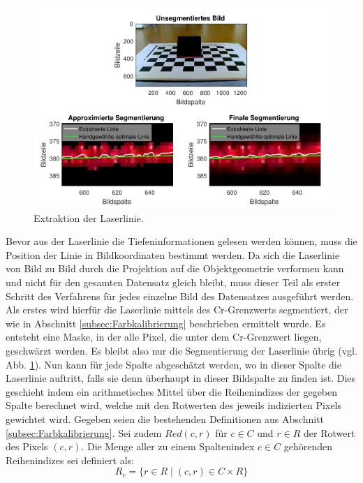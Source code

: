 \begin{figure}
\includegraphics[width=\textwidth]{images/LineSegmentationPlottedCramped2.pdf}
\caption[Extraktion der Laserlinie]{Extraktion der Laserlinie.}\label{fig:LaserLinieExtraktion}
\end{figure}


Bevor aus der Laserlinie die Tiefeninformationen gelesen werden können, muss die Position der Linie in Bildkoordinaten bestimmt werden. Da sich die Laserlinie von Bild zu Bild durch die Projektion auf die Objektgeometrie verformen kann und nicht für den gesamten Datensatz gleich bleibt, muss dieser Teil als erster Schritt des Verfahrens für jedes einzelne Bild des Datensatzes ausgeführt werden. Als erstes wird hierfür die Laserlinie mittels des Cr-Grenzwerts segmentiert, der wie in Abschnitt \ref{subsec:Farbkalibrierung} beschrieben ermittelt wurde. Es entsteht eine Maske, in der alle Pixel, die unter dem Cr-Grenzwert liegen, geschwärzt werden. Es bleibt also nur die Segmentierung der Laserlinie übrig (vgl. Abb. \ref{fig:LaserLinieExtraktion}). Nun kann für jede Spalte abgeschätzt werden, wo in dieser Spalte die Laserlinie auftritt, falls sie denn überhaupt in dieser Bildspalte zu finden ist. Dies geschieht indem ein arithmetisches Mittel über die Reihenindizes der gegeben Spalte berechnet wird, welche mit den Rotwerten des jeweils indizierten Pixels gewichtet wird. Gegeben seien die bestehenden Definitionen aus Abschnitt \ref{subsec:Farbkalibrierung}. Sei zudem \(Red(c,r)\) für \(c \in C\) und \(r \in R\) der Rotwert des Pixels \((c,r)\). Die Menge aller zu einem Spaltenindex \(c \in C\) gehörenden Reihenindizes sei definiert als:
\begin{equation}
R_{c} = \lbrace r \in R \mid (c, r) \in C \times R \rbrace
\end{equation}


